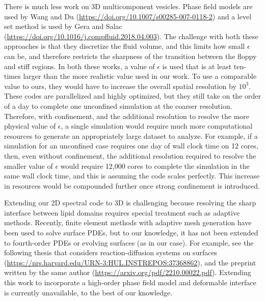 \documentclass[11pt]{article}
\begin{document}
\begin{enumerate}
There is much less work on 3D multicomponent vesicles. Phase field
models are used by Wang and Du
(\url{https://doi.org/10.1007/s00285-007-0118-2}) and a level set method
is used by Gera and Salac
(\url{https://doi.org/10.1016/j.compfluid.2018.04.003}). The challenge
with both these approaches is that they discretize the fluid volume, and
this limits how small $\epsilon$ can be, and therefore restricts the
sharpness of the transition between the floppy and stiff regions. In
both these works, a value of $\epsilon$ is used that is at least
ten-times larger than the more realistic value used in our work. To use
a comparable value to ours, they would have to increase the overall
spatial resolution by $10^3$. These codes are parallelized and highly
optimized, but they still take on the order of a day to complete one
unconfined simulation at the coarser resolution. Therefore, with
confinement, and the additional resolution to resolve the more physical
value of $\epsilon$, a single simulation would require much more
computational resources to generate an appropriately large dataset to
analyze. For example, if a simulation for an unconfined case requires
one day of wall clock time on 12 cores, then, even without confinement,
the additional resolution required to resolve the smaller value of
$\epsilon$ would require 12,000 cores to complete the simulation in the
same wall clock time, and this is assuming the code scales perfectly.
This increase in resources would be compounded further once strong
confinement is introduced.

Extending our 2D spectral code to 3D is challenging because resolving
the sharp interface between lipid domains requires special treatment
such as adaptive methods. Recently, finite element methods with adaptive
mesh generation have been used to solve surface PDEs, but to our
knowledge, it has not been extended to fourth-order PDEs or evolving
surfaces (as in our case). For example, see the following thesis that
considers reaction-diffusion systems on surfaces
(\url{https://nrs.harvard.edu/URN-3:HUL.INSTREPOS:37368862}), and the
preprint written by the same author
(\url{https://arxiv.org/pdf/2210.00022.pdf}). Extending this work to
incorporate a high-order phase field model and deformable interface is
currently unavailable, to the best of our knowledge.



\end{enumerate}
\end{document}
